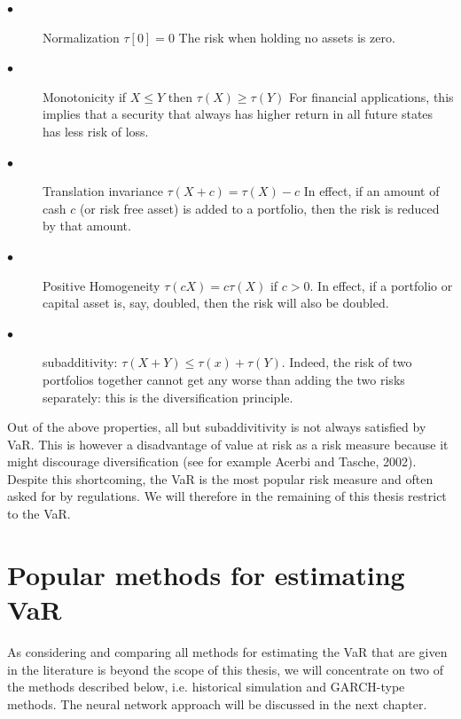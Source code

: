 \documentclass[a4paper,11pt,oneside]{book}
\begin{document}
\begin{description}
	\item[$\bullet$] Normalization \newline $\tau[0] = 0$ \newline The risk when holding no assets is zero.
	\item[$\bullet$] Monotonicity \newline if $X \leq Y$ then $\tau(X) \geq \tau(Y)$ \newline For financial applications, this implies that a
	security that always has higher return in all future states has less risk of loss.
	
	\item[$\bullet$] Translation invariance
	\newline  $\tau(X+c) = \tau(X)-c$ \newline In effect, if an amount of cash $c$ (or risk free asset)
	is added to a portfolio, then the risk is reduced by that amount.
	\item[$\bullet$] Positive Homogeneity
	\newline $\tau(cX) = c\tau(X)$ if $c>0$. \newline In effect, if a portfolio or capital asset is, say,
	doubled, then the risk will also be doubled.
	
		\item[$\bullet$] subadditivity: 
	\newline $\tau(X+Y)\leq \tau(x)+\tau(Y)$. 
	Indeed, the risk of two portfolios together cannot get any worse than adding the two risks separately: this is the diversification principle.
	
\end{description}
Out of the above properties, all but subaddivitivity is not always satisfied by VaR. This is however a disadvantage of value at risk as a risk measure because it might discourage diversification (see for example Acerbi and Tasche, 2002). Despite this shortcoming, the VaR is the most popular risk measure and often asked for by regulations. We will therefore in the remaining of this thesis restrict to the VaR.

\section{Popular methods for estimating VaR}
As considering and comparing all methods for estimating the VaR that are given in the literature is beyond the scope of this thesis, we will concentrate on two of the methods described below, i.e. historical simulation and GARCH-type methods. The neural network approach will be discussed in the next chapter.
\end{document}
